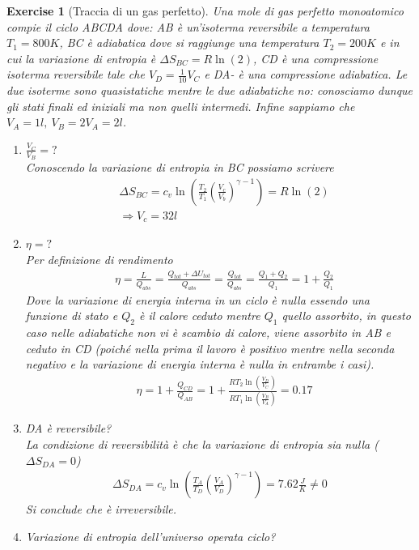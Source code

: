 \documentclass[10pt,a4paper]{article}
\newtheorem{exercise}{Exercise}
\begin{document}
\begin{exercise}[Traccia di un gas perfetto]
Una mole di gas perfetto monoatomico compie il ciclo ABCDA dove: AB è un'isoterma reversibile a temperatura \(T_1 = 800 K\), BC è adiabatica dove si raggiunge una temperatura \(T_2 = 200 K\) e in cui la variazione di entropia è \(\Delta S_{BC}=R\ln(2)\), CD è una compressione isoterma reversibile tale che \(V_D = \frac{1}{10}V_C\) e DA- è una compressione adiabatica. Le due isoterme sono quasistatiche mentre le due adiabatiche no: conosciamo dunque gli stati finali ed iniziali ma non quelli intermedi. Infine sappiamo che \(V_A = 1l,\ V_B =2V_A=2l\).
\begin{enumerate}
\item \(\frac{V_C}{V_B} = ?\)\\
Conoscendo la variazione di entropia in BC possiamo scrivere
\begin{align*}
	&\Delta S_{BC} = c_v \ln(\frac{T_2}{T_1}\left(\frac{V_c}{V_b}\right)^{\gamma - 1}) = R\ln(2)\\
	&\Rightarrow V_c = 32l
\end{align*}
\item \(\eta = ?\)\\
Per definizione di rendimento
\begin{align*}
	&\eta = \frac{L}{Q_{abs}} = \frac{Q_{tot}+\Delta U_{tot}}{Q_{abs}}=\frac{Q_{tot}}{Q_{abs}}=\frac{Q_1 + Q_2}{Q_1} = 1+\frac{Q_2}{Q_1}
\end{align*}
Dove la variazione di energia interna in un ciclo è nulla essendo una funzione di stato e \(Q_2\) è il calore ceduto mentre \(Q_1\) quello assorbito, in questo caso nelle adiabatiche non vi è scambio di calore, viene assorbito in AB e ceduto in CD (poiché nella prima il lavoro è positivo mentre nella seconda negativo e la variazione di energia interna è nulla in entrambe i casi).
\begin{align*}
	&\eta = 1+\frac{Q_{CD}}{Q_{AB}} = 1+\frac{R T_2\ln(\frac{V_D}{V_C})}{R T_1\ln(\frac{V_B}{V_A})}=0.17
\end{align*}
\item DA è reversibile?\\
La condizione di reversibilità è che la variazione di entropia sia nulla (\(\Delta S_{DA} = 0\))
\begin{align*}
	\Delta S_{DA} = c_v \ln\left(\frac{T_A}{T_D}\left(\frac{V_A}{V_D}\right)^{\gamma - 1}\right) = 7.62 \frac{J}{K}\neq 0
\end{align*}
Si conclude che è irreversibile. 
\item Variazione di entropia dell'universo operata ciclo?\\

\end{enumerate}
\end{exercise}
\end{document}
